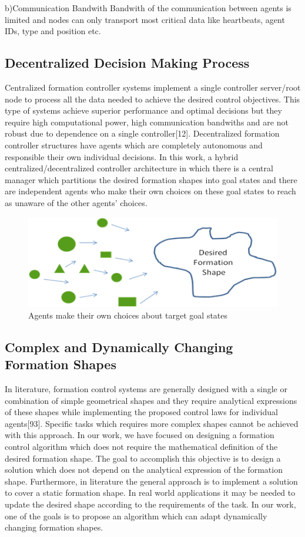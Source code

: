 b)Communication Bandwith \newline
Bandwith of the communication between agents is limited and nodes can only transport most critical data like heartbeats, agent IDs, type and position etc.

\subsection{ Decentralized Decision Making Process}
Centralized formation controller systems implement a single controller  server/root node
to process all the data needed to achieve the desired control objectives. This type of systems achieve superior performance and optimal decisions  but they require high computational power, high communication bandwiths and are not robust due to dependence on a single controller[12]. Decentralized formation controller structures have agents which are completely autonomous and responsible their own individual decisions. In this work, a hybrid centralized/decentralized controller architecture in which there is a central manager which partitions the desired formation shapes into goal states and there are independent agents who make their own choices on these goal states to reach as unaware of the other agents' choices.

\begin{figure}[H]
\caption{Agents make their own choices about target goal states}
\centering
\includegraphics[scale = 1]{decentralized}
\end{figure} 

\subsection{Complex and Dynamically Changing Formation Shapes}
In literature, formation control systems are generally designed with a single or combination of simple geometrical shapes and they require analytical expressions of these shapes while implementing the proposed control laws for individual agents[93]. Specific tasks which requires more complex shapes cannot be achieved with this approach. In our work, we have focused on designing a formation control algorithm which does not require the mathematical definition of the desired formation shape. The goal to accomplish this objective is to design a solution which does not depend on the analytical expression of the formation shape. Furthermore, in literature the general approach is to implement a solution to cover a static formation shape. In real world applications it may be needed to update the desired shape according to the requirements of the task. In our work, one of the goals is to propose an algorithm which can adapt dynamically changing formation shapes.


